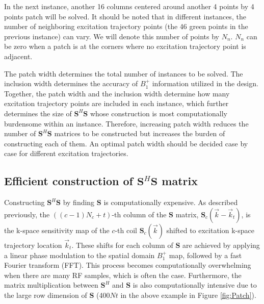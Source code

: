 In the next instance, another 16 columns centered around another 4 points by 4 points patch will be solved. It should be noted that in different instances, the number of neighboring excitation trajectory points (the 46 green points in the previous instance) can vary. We will denote this number of points by $N_n$. $N_n$ can be zero when a patch is at the corners where no excitation trajectory point is adjacent. 

\par The patch width determines the total number of instances to be solved. The inclusion width determines the accuracy of $B_1^+$ information utilized in the design. Together, the patch width and the inclusion width determine how many excitation trajectory points are included in each instance, which further determines the size of $\mathbf{S}^{H}\mathbf{S}$ whose construction is most computationally burdensome within an instance. Therefore, increasing patch width reduces the number of $\mathbf{S}^{H}\mathbf{S}$ matrices to be constructed but increases the burden of constructing each of them. An optimal patch width should be decided case by case for different excitation trajectories. 

\subsection*{Efficient construction of $\mathbf{S}^{H}\mathbf{S}$ matrix}
\par Constructing $\mathbf{S}^{H}\mathbf{S}$ by finding $\mathbf{S}$ is computationally expensive. As described previously, the $((c-1)N_c+t)$-th column of the  $\mathbf{S}$ matrix, $\mathbf{S}_c(\vec{k}-\vec{k}_t)$, is the k-space sensitivity map of the $c$-th coil $\mathbf{S}_c(\vec{k})$ shifted to excitation k-space trajectory location $\vec{k}_t$. These shifts for each column of $\mathbf{S}$ are achieved by applying a linear phase modulation to the spatial domain $B_1^+$ map, followed by a fast Fourier transform (FFT). This process becomes computationally overwhelming when there are many RF samples, which is often the case. Furthermore, the matrix multiplication between $\mathbf{S}^{H}$ and $\mathbf{S}$ is also computationally intensive due to the large row dimension of $\mathbf{S}$ (400$Nt$ in the above example in Figure \ref{fig:Patch}).  


